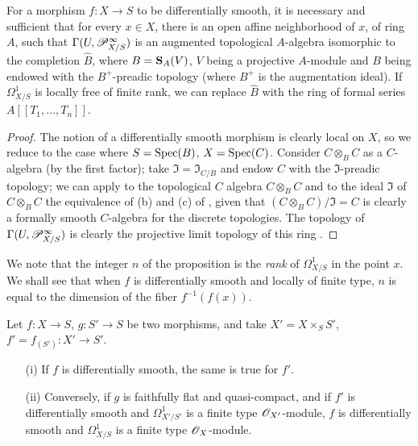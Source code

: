 \begin{proposition}[16.10.3]
\label{IV.16.10.3}
For a morphism $f:X \to S$ to be differentially smooth, it is necessary and sufficient that for every $x \in X$, there is an open affine neighborhood of $x$, of ring $A$, such that $\Gamma(U, \mathscr{P}_{X/S}^\infty)$ is an augmented topological $A$-algebra isomorphic to the completion $\widehat{B}$, where $B = \mathbf{S}_A(V)$, $V$ being a projective $A$-module and $B$ being endowed with the $B^+$-preadic topology (where $B^+$ is the augmentation ideal).
If $\Omega_{X/S}^1$ is locally free of finite rank, we can replace $\widehat{B}$ with the ring of formal series $A[[T_1, \dots, T_n]]$.
\end{proposition}

\begin{proof}
The notion of a differentially smooth morphism is clearly local on $X$, so we reduce to the case where $S = \operatorname{Spec}(B)$, $X = \operatorname{Spec}(C)$.
Consider $C \otimes_B C$ as a $C$-algebra (by the first factor);
take $\mathfrak{I} = \mathfrak{I}_{C/B}$ and endow $C$ with the $\mathfrak{I}$-preadic topology;
we can apply to the topological $C$ algebra $C \otimes_B C$ and to the ideal $\mathfrak{I}$ of $C \otimes_B C$ the equivalence of (b) and (c) of , given that $(C \otimes_B C)/\mathfrak{I} = C$ is clearly a formally smooth $C$-algebra for the discrete topologies.
The topology of $\Gamma(U, \mathscr{P}_{X/S}^\infty)$ is clearly the projective limit topology of this ring .
\end{proof}

We note that the integer $n$ of the proposition  is the \emph{rank} of $\Omega_{X/S}^1$ in the point $x$.
We shall see  that when $f$ is differentially smooth and locally of finite type, $n$ is equal to the dimension of the fiber $f^{-1}(f(x))$. 

\begin{proposition}[16.10.4]
\label{IV.16.10.4}
Let $f:X \to S$, $g:S' \to S$ be two morphisms, and take $X' = X \times_S S'$, $f' = f_{(S')}:X' \to S'$.
\begin{enumerate}
  \item[\rm{(i)}] If $f$ is differentially smooth, the same is true for $f'$. 
  \item[\rm{(ii)}] Conversely, if $g$ is faithfully flat and quasi-compact, and if $f'$ is differentially smooth and $\Omega_{X'/S'}^1$ is a finite type $\mathscr{O}_{X'}$-module, $f$ is differentially smooth and $\Omega_{X/S}^1$ is a finite type $\mathscr{O}_X$-module.
\end{enumerate}
\end{proposition}

